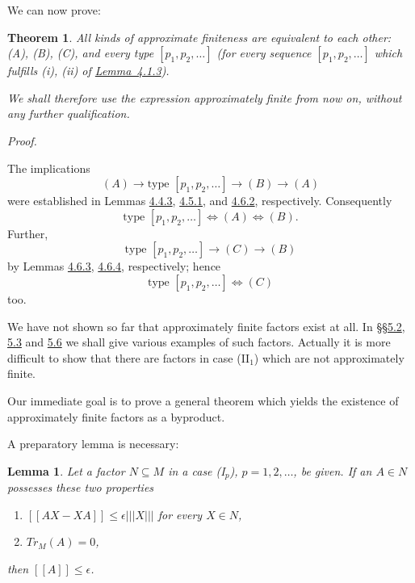 \documentclass[b5paper,twoside]{article}
\newcommand{\lemref}[2]{\hyperref[#1]{\mbox{Lemma~#2}}}
\theoremstyle{mvnplain}
\newtheorem{theorem}{Theorem}
\newtheorem{lemma}{Lemma}[section]
\renewenvironment{proof}[1][Proof]{%
  \par\addvspace{0.35\baselineskip}%
  \noindent\textit{#1.}\ \normalfont\ignorespaces
}{%
  \par\addvspace{0.35\baselineskip}%
}
\newcommand{\M}{\mathbf M}
\newcommand{\N}{\mathbf N}
\newcommand{\Metric}[1]{\left[\!\left[#1\right]\!\right]}
\newcommand{\OpNorm}[1]{\left\lvert\left\lvert\left\lvert#1\right\rvert\right\rvert\right\rvert}
\def\M{M}%
\def\N{N}%
\def\Metric#1{[[#1]]}%
\def\operatorname#1{#1}%
\begin{document}
We can now prove:

\begin{theorem}\label{thm:XII}
All kinds of approximate finiteness are equivalent to each other: (A), (B),
(C), and every type \([p_1,p_2,\ldots]\) (for every sequence
\([p_1,p_2,\ldots]\) which fulfills (i), (ii) of
\lemref{lem:4.1.3}{4.1.3}).

We shall therefore use the expression approximately finite from now on,
without any further qualification.
\end{theorem}

\begin{proof}
The implications
\[
 (A)\longrightarrow\text{type }[p_1,p_2,\ldots]
 \longrightarrow(B)\longrightarrow(A)
\]
were established in Lemmas \hyperref[lem:4.4.3]{4.4.3},
\hyperref[lem:4.5.1]{4.5.1}, and \hyperref[lem:4.6.2]{4.6.2}, respectively.
Consequently
\[
 \text{type }[p_1,p_2,\ldots]\Longleftrightarrow(A)\Longleftrightarrow(B).
\]
Further,
\[
 \text{type }[p_1,p_2,\ldots]\longrightarrow(C)\longrightarrow(B)
\]
by Lemmas \hyperref[lem:4.6.3]{4.6.3},
\hyperref[lem:4.6.4]{4.6.4}, respectively;
hence
\[
 \text{type }[p_1,p_2,\ldots]\Longleftrightarrow(C)
\]
too.
\end{proof}

We have not shown so far that approximately finite factors exist at all. In
\hyperref[sec:5.2]{\S\S5.2}, \hyperref[sec:5.3]{5.3} and
\hyperref[sec:5.6]{5.6} we shall give various examples of such factors. Actually
it is more difficult to show that there are factors in case (II\(_1\)) which
are not approximately finite.

Our immediate goal is to prove a general theorem which yields the existence
of approximately finite factors as a byproduct.

A preparatory lemma is necessary:

\begin{lemma}\label{lem:4.7.1}
Let a factor \(\N\subseteq\M\) in a case (I\(_p\)),
\(p=1,2,\ldots\), be given. If an \(A\in\N\) possesses these two properties
\begin{enumerate}[label=(\roman*)]
\item \(\Metric{AX-XA}\leq\epsilon\OpNorm{X}\) for every \(X\in\N\),
\item \(\operatorname{Tr}_{\M}(A)=0\),
\end{enumerate}
then \(\Metric{A}\leq\epsilon\).
\end{lemma}
\end{document}
